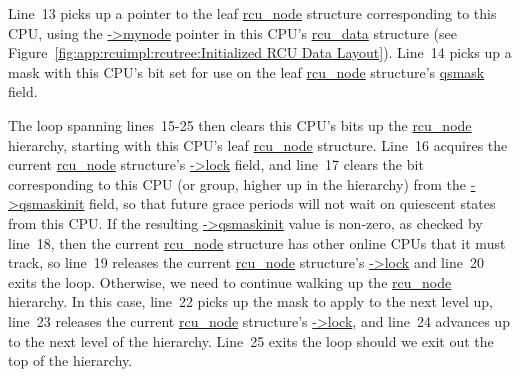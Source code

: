  \QuickQuizEnd

Line~13 picks up a pointer to the leaf \url{rcu_node} structure corresponding
to this CPU, using the \url{->mynode} pointer in this CPU's \url{rcu_data}
structure
(see Figure~\ref{fig:app:rcuimpl:rcutree:Initialized RCU Data Layout}).
Line~14 picks up a mask with this CPU's bit set for use on
the leaf \url{rcu_node} structure's \url{qsmask} field.

The loop spanning lines~15-25 then clears this CPU's bits up the
\url{rcu_node} hierarchy, starting with this CPU's leaf \url{rcu_node}
structure.
Line~16 acquires the current \url{rcu_node} structure's \url{->lock}
field, and line~17 clears the bit corresponding to this CPU
(or group, higher up in the hierarchy) from the \url{->qsmaskinit}
field, so that future grace periods will not wait on quiescent states
from this CPU.
If the resulting \url{->qsmaskinit} value is non-zero, as checked by
line~18, then the
current \url{rcu_node} structure has other online CPUs that it
must track, so line~19 releases the current \url{rcu_node} structure's
\url{->lock} and line~20 exits the loop.
Otherwise, we need to continue walking up the \url{rcu_node} hierarchy.
In this case, line~22 picks up the mask to apply to the next level up,
line~23 releases the current \url{rcu_node} structure's \url{->lock},
and line~24 advances up to the next level of the hierarchy.
Line~25 exits the loop should we exit out the top of the hierarchy.

 \QuickQuizEnd

